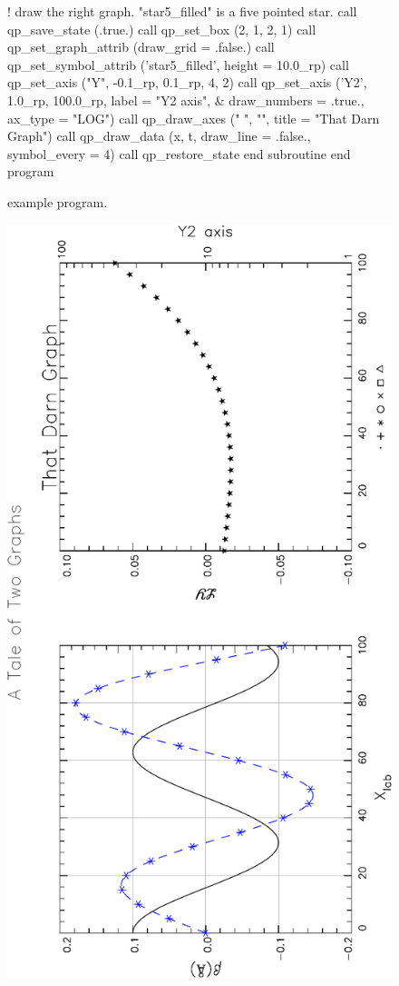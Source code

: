 \begin{figure}
\begin{listing}{1}
    ! draw the right graph. "star5_filled" is a five pointed star.
    call qp_save_state (.true.)
    call qp_set_box (2, 1, 2, 1)
    call qp_set_graph_attrib (draw_grid = .false.)
    call qp_set_symbol_attrib ('star5_filled', height = 10.0_rp)
    call qp_set_axis ("Y", -0.1_rp, 0.1_rp, 4, 2)
    call qp_set_axis ('Y2', 1.0_rp, 100.0_rp, label = "Y2 axis", &
                                draw_numbers = .true., ax_type = "LOG")
    call qp_draw_axes ("      ", "\fsLY\fn", title = "That Darn Graph")
    call qp_draw_data (x, t, draw_line = .false., symbol_every = 4)
    call qp_restore_state
  end subroutine
  end program
\end{listing}
\caption{\quickplot example program.}
\label{f:plot.example}
\end{figure}


\begin{figure}
\centering
\includegraphics[angle=-90,width=5.5in]{plot-example.pdf}

\end{figure}

